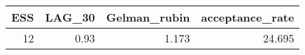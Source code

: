 \begin{longtable}{rrrr}
\toprule
ESS & LAG\_30 & Gelman\_rubin & acceptance\_rate \\ 
\midrule
12 & 0.93 & 1.173 & 24.695 \\ 
\bottomrule
\end{longtable}

